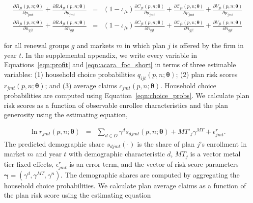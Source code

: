 \documentclass[12pt]{article}
\begin{document}
\vspace{-0.4in}	
\begin{footnotesize}
\begin{eqnarray}
\label{eqn:acara_foc_short}
	\frac{\partial R_{ft}(\textit{p},\textit{n};\boldsymbol{\theta})}{\partial p_{jmt}} + \frac{\partial RA_{ft}(\textit{p},\textit{n};\boldsymbol{\theta})}{\partial p_{jmt}} &=& (1-\iota_{ft}) \frac{\partial C_{ft}(\textit{p},\textit{n};\boldsymbol{\theta})}{\partial p_{jmt}} + \frac{\partial \mathcal{C}_{ft}(\textit{p},\textit{n};\boldsymbol{\theta})}{\partial p_{jmt}} + \frac{\partial V_{ft}(\textit{p},\textit{n};\boldsymbol{\theta})}{\partial p_{jmt}} \nonumber \\
	\frac{\partial R_{ft}(\textit{p},\textit{n};\boldsymbol{\theta})}{\partial n_{gjt}} + \frac{\partial RA_{ft}(\textit{p},\textit{n};\boldsymbol{\theta})}{\partial n_{gjt}} &=& (1-\iota_{ft}) \frac{\partial C_{ft}(\textit{p},\textit{n};\boldsymbol{\theta})}{\partial n_{gjt}} + \frac{\partial \mathcal{C}_{ft}(\textit{p},\textit{n};\boldsymbol{\theta})}{\partial n_{gjt}} + \frac{\partial V_{ft}(\textit{p},\textit{n};\boldsymbol{\theta})}{\partial n_{gjt}}
\end{eqnarray}
\end{footnotesize}

\noindent for all renewal groups $g$ and markets $m$ in which plan $j$ is offered by the firm in year $t$. In the supplemental appendix, we write every variable in Equations~\eqref{eqn:profit} and \eqref{eqn:acara_foc_short} in terms of three estimable variables: (1) household choice probabilities $q_{ijt}(\textit{p},\textit{n};\boldsymbol{\theta})$; (2) plan risk scores $r_{jmt}(\textit{p},\textit{n};\boldsymbol{\theta})$; and (3) average claims $c_{jmt}(\textit{p},\textit{n};\boldsymbol{\theta})$.  Household choice probabilities are computed using Equation~\eqref{eqn:choice_probs}.  We calculate plan risk scores as a function of observable enrollee characteristics and the plan generosity using the estimating equation,

\vspace{-0.4in}
\begin{eqnarray}
\label{eqn:risk_score_estimation}
	\ln r_{jmt}(\textit{p},\textit{n};\boldsymbol{\theta}) &=& \sum_{d \in D} \gamma^d s_{djmt}(\textit{p},\textit{n};\boldsymbol{\theta}) + MT'_j \gamma^{MT} + \epsilon_{jmt}^r.
\end{eqnarray}
The predicted demographic share $s_{djmt}(\cdot)$ is the share of plan $j$'s enrollment in market $m$ and year $t$ with demographic characteristic $d$, $MT_j$ is a vector metal tier fixed effects,  $\epsilon_{jmt}^r$ is an error term, and the vector of risk score parameters $\boldsymbol{\gamma} = (\gamma^d,\gamma^{MT},\gamma^{n})$. The demographic shares are computed by aggregating the household choice probabilities.   We calculate plan average claims as a function of the plan risk score using the estimating equation 
\end{document}
